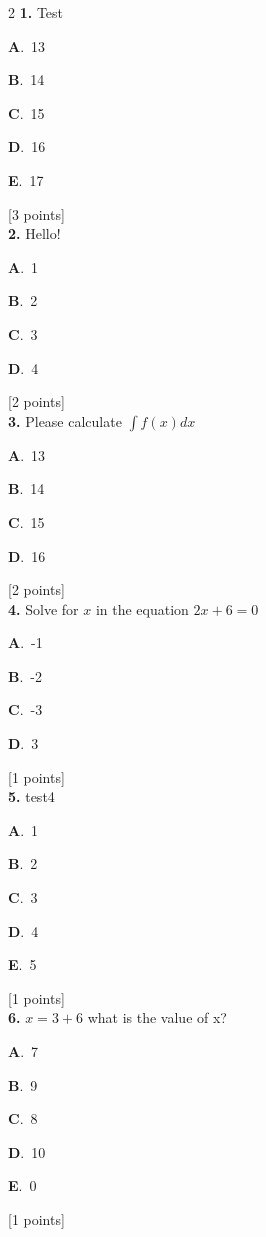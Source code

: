 \documentclass[12pt]{article}
\newcommand{\choice}[3]{%
  \noindent\textbf{#1}.~#2\hfill#3\par\vspace{0.25em}
}
\begin{document}
\begin{multicols}{2}
\noindent \textbf{\textenglish{1.}} {\textenglish{Test}}

\noindent\choice{A}{{\textenglish{13}}}{}
\noindent\choice{B}{{\textenglish{14}}}{}
\noindent\choice{C}{{\textenglish{15}}}{}
\noindent\choice{D}{{\textenglish{16}}}{}
\noindent\choice{E}{{\textenglish{17}}}{}
\hfill {\textenglish{[3 points]}}\\[0.5em]

\noindent \textbf{\textenglish{2.}} {\textenglish{Hello!}}

\noindent\choice{A}{{\textenglish{1}}}{}
\noindent\choice{B}{{\textenglish{2}}}{}
\noindent\choice{C}{{\textenglish{3}}}{}
\noindent\choice{D}{{\textenglish{4}}}{}
\hfill {\textenglish{[2 points]}}\\[0.5em]

\noindent \textbf{\textenglish{3.}} {\textenglish{Please calculate }}\(\int f(x)dx\)

\noindent\choice{A}{{\textenglish{13}}}{}
\noindent\choice{B}{{\textenglish{14}}}{}
\noindent\choice{C}{{\textenglish{15}}}{}
\noindent\choice{D}{{\textenglish{16}}}{}
\hfill {\textenglish{[2 points]}}\\[0.5em]

\noindent \textbf{\textenglish{4.}} {\textenglish{Solve for }}\(x \){\textenglish{ in the equation }}\(2x+6 = 0 \)

\noindent\choice{A}{{\textenglish{-1}}}{}
\noindent\choice{B}{{\textenglish{-2}}}{}
\noindent\choice{C}{{\textenglish{-3}}}{}
\noindent\choice{D}{{\textenglish{3}}}{}
\hfill {\textenglish{[1 points]}}\\[0.5em]

\noindent \textbf{\textenglish{5.}} {\textenglish{test4}}

\noindent\choice{A}{{\textenglish{1}}}{}
\noindent\choice{B}{{\textenglish{2}}}{}
\noindent\choice{C}{{\textenglish{3}}}{}
\noindent\choice{D}{{\textenglish{4}}}{}
\noindent\choice{E}{{\textenglish{5}}}{}
\hfill {\textenglish{[1 points]}}\\[0.5em]

\noindent \textbf{\textenglish{6.}} \(x=3+6 \){\textenglish{ what is the value of x?}}

\noindent\choice{A}{{\textenglish{7}}}{}
\noindent\choice{B}{{\textenglish{9}}}{}
\noindent\choice{C}{{\textenglish{8}}}{}
\noindent\choice{D}{{\textenglish{10}}}{}
\noindent\choice{E}{{\textenglish{0}}}{}
\hfill {\textenglish{[1 points]}}\\[0.5em]


\end{multicols}
\end{document}
